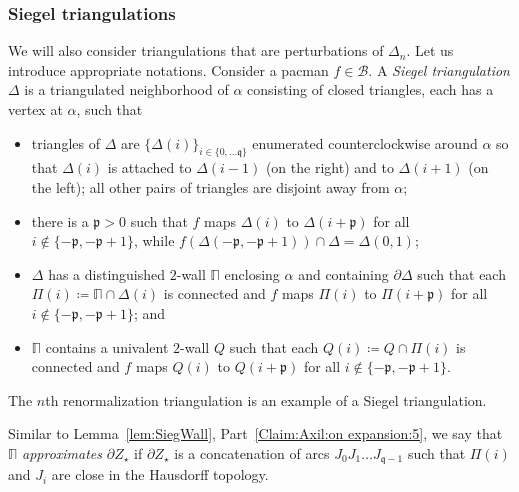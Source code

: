 \documentclass[]{amsart}
\newcommand{\bDelta}{{\mathbb{\Delta}}}
\newcommand{\bPi}{{\mathbb{\Pi}}}
\newcommand{\str}{{\star}}
\newcommand{\pp}{\mathfrak{p}}
\renewcommand{\qq}{\mathfrak{q}}
\newcommand\wall{{Q}}
\newcommand\BB{\mathcal{B}}
\theoremstyle{remark}
\numberwithin{equation}{section}
\theoremstyle{definition}
\begin{document}
\subsubsection{Siegel triangulations}
\label{ss:SiegTriang} We will also consider triangulations that are perturbations of $\bDelta_n$. Let us introduce appropriate notations.
Consider a pacman $f\in \BB$. A \emph{Siegel triangulation} $\bDelta$ is a triangulated neighborhood of $\alpha$ consisting of closed triangles, each has a vertex at $\alpha$, such that
\begin{itemize}
\item triangles of $\bDelta$ are $\{\Delta(i)\}_{i\in \{0,\dots \qq\}}$ enumerated counterclockwise around $\alpha$ so that $\Delta(i)$ is attached to $\Delta(i-1)$ (on the right) and to $\Delta(i+1)$ (on the left); all other pairs of triangles are disjoint away from $\alpha$;
\item there is a $\pp>0$ such that $f$ maps $\Delta(i)$ to $\Delta(i+\pp)$ for all $i\not\in \{-\pp, -\pp+1\}$, while $f(\Delta(-\pp, -\pp+1))\cap \bDelta=\Delta(0,1)$;
\item $\bDelta$ has a distinguished $2$-wall $\bPi$ enclosing $\alpha$ and containing $\partial \bDelta$ such that each $\Pi(i)\coloneqq \bPi\cap \Delta(i)$ is connected and $f$ maps $\Pi(i)$ to $\Pi(i+\pp)$ for all $i\not\in \{-\pp, -\pp+1\}$; and 
\item  $\bPi$ contains a univalent $2$-wall $\wall$ such that each $\wall(i)\coloneqq \wall\cap \Pi(i)$ is connected and $f$ maps $\wall(i)$ to $\wall(i+\pp)$ for all $i\not\in \{-\pp, -\pp+1\}$.
 \end{itemize}
The $n$th renormalization triangulation is an example of a Siegel triangulation.


Similar to Lemma~\ref{lem:SiegWall}, Part~\eqref{Claim:Axil:on expansion:5}, we say that $\bPi$ \emph{approximates} $\partial Z_\str$ if $\partial Z_\str$ is a concatenation of arcs $J_0J_1\dots J_{\qq-1}$ such that $\Pi(i)$ and $J_i$ are close in the Hausdorff topology.
\end{document}
